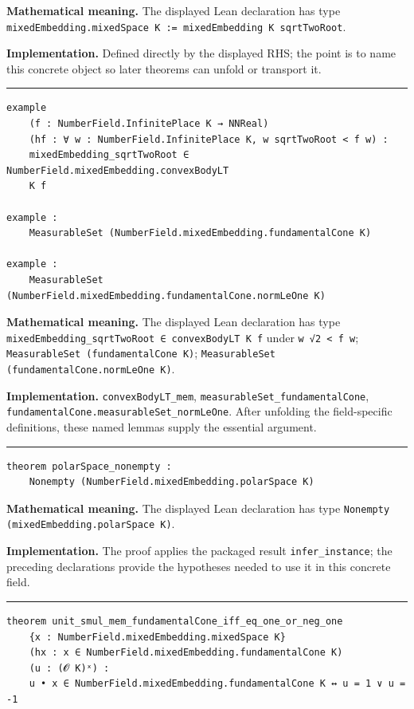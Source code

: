 \documentclass[UTF8,a4paper,11pt,fontset=fandol]{ctexart}
\theoremstyle{definition}
\newcommand{\statementsep}{\par\medskip\hrule\medskip}
\begin{document}
\noindent\textbf{Mathematical meaning.} The displayed Lean declaration has type \texttt{mixedEmbedding.\allowbreak{}mixedSpace K := mixedEmbedding K sqrtTwoRoot}.\par
\noindent\textbf{Implementation.} Defined directly by the displayed RHS; the point is to name this concrete object so later theorems can unfold or transport it.\par
\statementsep
\begin{verbatim}
example
    (f : NumberField.InfinitePlace K → NNReal)
    (hf : ∀ w : NumberField.InfinitePlace K, w sqrtTwoRoot < f w) :
    mixedEmbedding_sqrtTwoRoot ∈ NumberField.mixedEmbedding.convexBodyLT
    K f

example :
    MeasurableSet (NumberField.mixedEmbedding.fundamentalCone K)

example :
    MeasurableSet (NumberField.mixedEmbedding.fundamentalCone.normLeOne K)
\end{verbatim}
\noindent\textbf{Mathematical meaning.} The displayed Lean declaration has type \texttt{mixedEmbedding\_\allowbreak{}sqrtTwoRoot ∈ convexBodyLT K f} under \texttt{w √2 < f w}; \texttt{MeasurableSet (fundamentalCone K)}; \texttt{MeasurableSet (fundamentalCone.\allowbreak{}normLeOne K)}.\par
\noindent\textbf{Implementation.} \texttt{convexBodyLT\_\allowbreak{}mem}, \texttt{measurableSet\_\allowbreak{}fundamentalCone}, \texttt{fundamentalCone.\allowbreak{}measurableSet\_\allowbreak{}normLeOne}. After unfolding the field-specific definitions, these named lemmas supply the essential argument.\par
\statementsep
\begin{verbatim}
theorem polarSpace_nonempty :
    Nonempty (NumberField.mixedEmbedding.polarSpace K)
\end{verbatim}
\noindent\textbf{Mathematical meaning.} The displayed Lean declaration has type \texttt{Nonempty (mixedEmbedding.\allowbreak{}polarSpace K)}.\par
\noindent\textbf{Implementation.} The proof applies the packaged result \texttt{infer\_\allowbreak{}instance}; the preceding declarations provide the hypotheses needed to use it in this concrete field.\par
\statementsep
\begin{verbatim}
theorem unit_smul_mem_fundamentalCone_iff_eq_one_or_neg_one
    {x : NumberField.mixedEmbedding.mixedSpace K}
    (hx : x ∈ NumberField.mixedEmbedding.fundamentalCone K)
    (u : (𝓞 K)ˣ) :
    u • x ∈ NumberField.mixedEmbedding.fundamentalCone K ↔ u = 1 ∨ u = -1
\end{verbatim}
\end{document}
